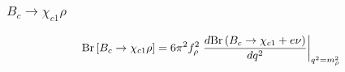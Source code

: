 \documentclass{beamer}
\begin{document}
\begin{frame}[t]
\begin{columns}
\begin{column}{0.5\textwidth}
    \end{column}
  \end{columns}
\end{frame}


\begin{frame}
  \frametitle{$B_c \to \chi_{c1} \rho$}
  $$
  \mathrm{Br}\left[B_c \to \chi_{c1} \rho\right] =
  6\pi^2 f_\rho^2 \left.
    \frac{d\mathrm{Br}\left(B_c\to\chi_{c1}+e\nu\right)}{dq^2}
  \right|_{q^2=m_\rho^2}
  $$
  \begin{columns}
    \begin{column}{0.5\textwidth}
      \vspace{3mm}
      
    \end{column}
  \begin{column}{0.5\textwidth}
      \\
      \vspace{3mm}
      
    \end{column}
\end{columns}
\end{frame}
\end{document}
